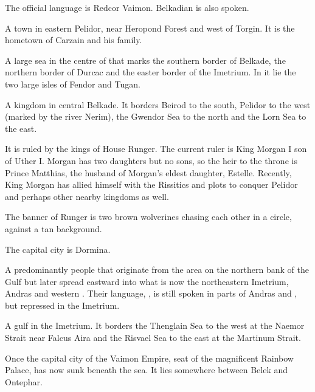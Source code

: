 The official language is Redcor Vaimon. Belkadian is also spoken. 



\gitem{\Redglen{}}
A town in eastern Pelidor, near Heropond Forest and west of Torgin. It is the hometown of Carzain \Shireyo{} and his family. 



\gitem{\Risvaelsea}
A large sea in the centre of \Azmith{} that marks the southern border of Belkade, the northern border of Durcac and the easter border of the Imetrium. In it lie the two large isles of Fendor and Tugan. 



A kingdom in central Belkade. 
It borders Beirod to the south, Pelidor to the west (marked by the river Nerim), the Gwendor Sea to the north and the Lorn Sea to the east. 


It is ruled by the kings of House Runger. The current ruler is King Morgan I son of Uther I. Morgan has two daughters but no sons, so the heir to the throne is Prince Matthias, the husband of Morgan's eldest daughter, Estelle. Recently, King Morgan has allied himself with the Rissitics and plots to conquer Pelidor and perhaps other nearby kingdoms as well. 

The banner of Runger is two brown wolverines chasing each other in a circle, against a tan background.

The capital city is Dormina. 



\gitem{\Samur}
\label{\Samurin}
A predominantly \scathaese{} people that originate from the area on the northern bank of the \Samure{} Gulf but later spread eastward into what is now the northeastern Imetrium, Andras and western \Scyrum. Their language, \Samurin{}, is still spoken in parts of Andras and \Scyrum, but repressed in the Imetrium. 



A gulf in the Imetrium. It borders the Thenglain Sea to the west at the Naemor Strait near Falcus Aira and the Risvael Sea to the east at the Martinum Strait. 



\gitem{\ShiinMerodar}
Once the capital city of the Vaimon Empire, seat of the magnificent Rainbow Palace, \Merodar has now sunk beneath the sea. It lies somewhere between Belek and Ontephar. 



